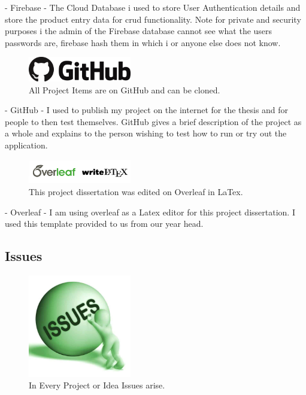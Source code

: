 - Firebase - The Cloud Database i used to store User Authentication details and store the product entry data for crud functionality. Note for private and security purposes i the admin of the Firebase database cannot see what the users passwords are, firebase hash them in which i or anyone else does not know.
\newline

\begin{figure}[h!]
	\caption{All Project Items are on GitHub and can be cloned.}
	\label{image:github}
	\centering
	\includegraphics[width=0.4\textwidth]{images/github.png}
\end{figure}

- GitHub - I used to publish my project on the internet for the thesis and for people to then test themselves. GitHub gives a brief description of the project as a whole and explains to the person wishing to test how to run or try out the application. 
\newline

\begin{figure}[h!]
	\caption{This project dissertation was edited on Overleaf in LaTex.}
	\label{image:overleaf-latex}
	\centering
	\includegraphics[width=0.4\textwidth]{images/overleaf-latex.png}
\end{figure}

- Overleaf - I am using overleaf as a Latex editor for this project dissertation. I used this template provided to us from our year head.

\subsection{Issues}

\begin{figure}[h!]
	\caption{In Every Project or Idea Issues arise.}
	\label{image:issues}
	\centering
	\includegraphics[width=0.4\textwidth]{images/issues.jpg}
\end{figure}

